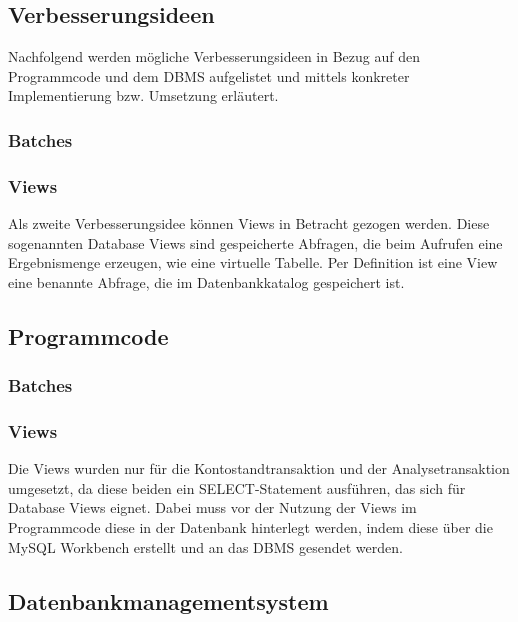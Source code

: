 \subsection{Verbesserungsideen}\label{subsec:verbesserungsideen}
Nachfolgend werden mögliche Verbesserungsideen in Bezug auf den Programmcode und dem DBMS aufgelistet und mittels konkreter Implementierung bzw. Umsetzung erläutert.
\subsubsection{Batches}

\subsubsection{Views}
Als zweite Verbesserungsidee können Views in Betracht gezogen werden.
Diese sogenannten Database Views sind gespeicherte Abfragen, die beim Aufrufen eine Ergebnismenge erzeugen, wie eine virtuelle Tabelle.
Per Definition ist eine View eine benannte Abfrage, die im Datenbankkatalog gespeichert ist.

\subsection{Programmcode}\label{subsec:programmcode}
\subsubsection{Batches}

\subsubsection{Views}
Die Views wurden nur für die Kontostandtransaktion und der Analysetransaktion umgesetzt, da diese beiden ein SELECT-Statement ausführen, das sich für Database Views eignet.
Dabei muss vor der Nutzung der Views im Programmcode diese in der Datenbank hinterlegt werden, indem diese über die MySQL Workbench erstellt und an das DBMS gesendet werden.




\subsection{Datenbankmanagementsystem}\label{subsec:datenbankmanagementsystem}